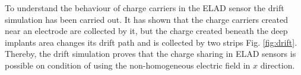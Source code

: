 To understand the behaviour of charge carriers in the ELAD sensor the drift simulation has been carried out. 
It has shown that the charge carriers created near an electrode are collected by it, but the charge created beneath the deep implants area
 changes its drift path and is collected by two strips Fig. \ref{fig:drift}.  
Thereby, the drift simulation proves that the charge sharing in ELAD sensors is possible on condition of using the non-homogeneous electric field in $x$ direction. 

\begin{figure}[H]
\begin{minipage}[h]{0.24\linewidth}
\end{minipage}
\begin{minipage}[h]{0.24\linewidth}
\end{minipage}
\begin{minipage}[h]{0.24\linewidth}

\end{minipage}
\end{figure}

